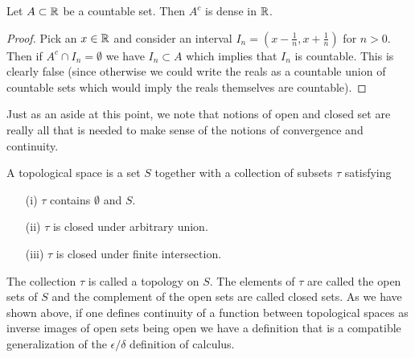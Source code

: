 \begin{lem}\label{ComplementOfCountableSetDense}Let $A \subset \mathbb{R}$ be a countable set.  Then $A^c$ is
  dense in $\mathbb{R}$.
\end{lem}
\begin{proof}
Pick an $x \in \mathbb{R}$ and consider an interval $I_n = (x - \frac{1}{n}, x +
\frac{1}{n})$ for $n > 0$.  Then if $A^c \cap I_n = \emptyset$ we have
$I_n \subset A$ which implies that $I_n$ is countable.  This is
clearly false (since otherwise we could write the reals as a countable
union of countable sets which would imply the reals themselves are countable).
\end{proof}

Just as an aside at this point, we note that notions of open and
closed set are really all that is needed to make sense of the notions
of convergence and continuity.
\begin{defn}A topological space is a set $S$ together with a
  collection of subsets $\tau$ satisfying
\begin{itemize}
\item[(i)]$\tau$ contains $\emptyset$ and $S$.
\item[(ii)]$\tau$ is closed under arbitrary union.
\item[(iii)]$\tau$ is closed under finite intersection.
\end{itemize}
The collection $\tau$ is called a topology on $S$.  The elements of
$\tau$ are called the open sets of $S$ and the complement of the open
sets are called closed sets.  As we have shown above, if one defines
continuity of a function between topological spaces as inverse images
of open sets being open we have a definition that is a compatible
generalization of the $\epsilon/\delta$ definition of calculus.
\end{defn}

